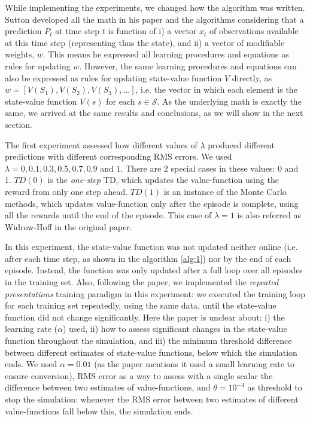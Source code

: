 \documentclass{article}
\begin{document}
While implementing the experiments, we changed how the algorithm was written.
Sutton developed all the math in his paper and the algorithms considering that a prediction $P_{t}$ at time step $t$ is function of i) a vector $x_{t}$ of observations available at this time step (representing thus the state), and ii) a vector of modifiable weights, $w$.
This means he expressed all learning procedures and equations as rules for updating $w$.
However, the same learning procedures and equations can also be expressed as rules for updating state-value function $V$ directly, as $w = [V(S_{1}), V(S_{2}), V(S_{3}), ...]$, i.e. the vector in which each element is the state-value function $V(s)$ for each $s \in \mathcal{S}$.
As the underlying math is exactly the same, we arrived at the same results and conclusions, as we will show in the next section.

The first experiment assessed how different values of $\lambda$ produced different predictions with different corresponding RMS errors.
We used $\lambda = 0, 0.1, 0.3, 0.5, 0.7, 0.9$ and $1$.
There are 2 special cases in these values: 0 and 1.
$TD(0)$ is the \emph{one-step} TD, which updates the value-function using the reward from only one step ahead.
$TD(1)$ is an instance of the Monte Carlo methods, which updates value-function only after the episode is complete, using all the rewards until the end of the episode.
This case of $\lambda = 1$ is also referred as Widrow-Hoff in the original paper.

In this experiment, the state-value function was not updated neither online (i.e. after each time step, as shown in the algorithm \ref{alg:1}) nor by the end of each episode.
Instead, the function was only updated after a full loop over all episodes in the training set.
Also, following the paper, we implemented the \emph{repeated presentations} training paradigm in this experiment: we executed the training loop for each training set repeatedly, using the same data, until the state-value function did not change significantly.
Here the paper is unclear about: i) the learning rate ($\alpha$) used, ii) how to assess significant changes in the state-value function throughout the simulation, and iii) the minimum threshold difference between different estimates of state-value functions, below which the simulation ends.
We used $\alpha = 0.01$ (as the paper mentions it used a small learning rate to ensure conversion), RMS error as a way to assess with a single scalar the difference between two estimates of value-functions, and $\theta = 10^{-4}$ as threshold to stop the simulation: whenever the RMS error between two estimates of different value-functions fall below this, the simulation ends.
\end{document}
